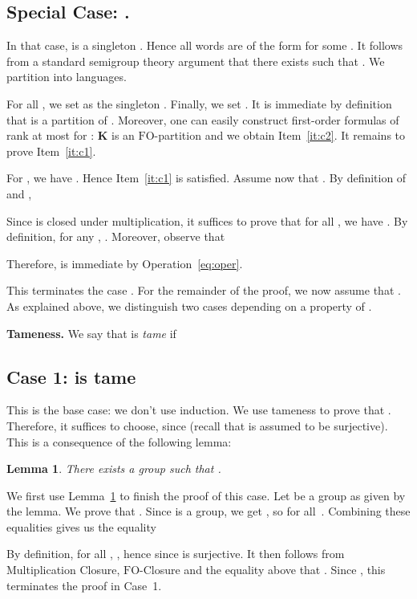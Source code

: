 \documentclass{CSML}
\newcommand\Kb{\ensuremath{\mathbf{K}}\xspace}
\newcommand{\fo}{\ensuremath{\text{FO}}\xspace}
\theoremstyle{plain}
\newtheorem{lemma}[thm]{Lemma}
\begin{document}
\subsection{\texorpdfstring{Special Case: .}{Special Case: |B| = 1.}}

In that case,  is a singleton . Hence all words are of the
form  for some . It follows from a standard semigroup
theory argument that there exists  such that . We
partition  into  languages.

For all , we set  as the singleton .
Finally, we set . It is immediate by
definition that  is a partition of .
Moreover, one can easily construct first-order formulas of rank at
most  for : \Kb is an
\fo-partition and we obtain Item~\ref{it:c2}. It remains to prove
Item~\ref{it:c1}.

For , we have . Hence Item~\ref{it:c1} is satisfied. Assume
now that . By definition of  and ,

Since  is closed under multiplication, it suffices to
prove that for all , we have . By definition, for any ,
. Moreover, observe that

Therefore,  is
immediate by Operation~\ref{eq:oper}.

\medskip

This terminates the case . For the remainder of the proof, we
now assume that . As explained above, we distinguish two
cases depending on a property of .

\medskip
\noindent
{\bf Tameness.} We say that  is \emph{tame} if  

\subsection{\texorpdfstring{Case 1:  is tame}{Case 1: beta is
    tame}} This is the base case: we don't use induction. We use
tameness to prove that . Therefore, it
suffices to choose,  since  (recall that  is assumed to be surjective).
This is a consequence of the following lemma:

\begin{lemma} \label{lem:basecase}
There exists a group  such that .
\end{lemma}

We first use Lemma~\ref{lem:basecase} to finish the proof of this
case. Let  be a group as given by the
lemma. We prove that . Since  is a
group, we get , so 
for all~. Combining these equalities gives us the equality

By definition, for all , , hence  since  is surjective. It then follows from
Multiplication Closure, \fo-Closure and the equality above that
. Since , this terminates the proof
in Case~1.
\end{document}
